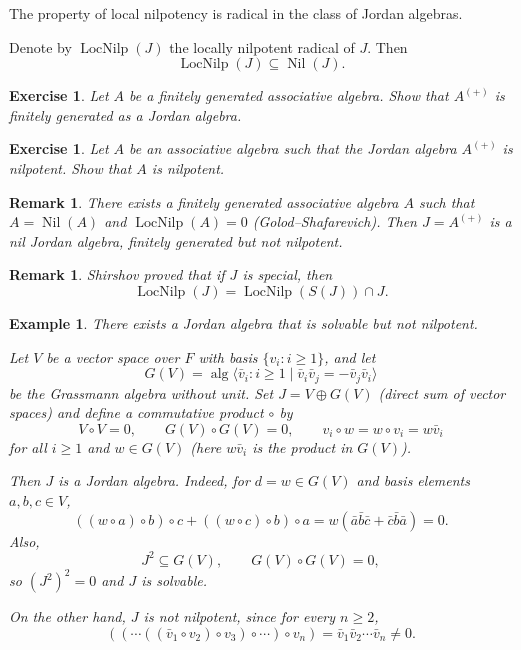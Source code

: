\documentclass{article}
\newtheorem{remark}[theorem]{Remark}
\newtheorem{example}[theorem]{Example}
\newtheorem{exercise}[theorem]{Exercise}
\begin{document}
\begin{theorem}[Zhevlakov]
The property of local nilpotency is radical in the class of Jordan algebras.
\end{theorem}

Denote by $\operatorname{LocNilp}(J)$ the locally nilpotent radical of $J$. Then
\[
\operatorname{LocNilp}(J)\subseteq \operatorname{Nil}(J).
\]

\begin{exercise}
Let $A$ be a finitely generated associative algebra. Show that $A^{(+)}$ is finitely generated as a Jordan algebra.
\end{exercise}

\begin{exercise}
Let $A$ be an associative algebra such that the Jordan algebra $A^{(+)}$ is nilpotent. Show that $A$ is nilpotent.
\end{exercise}

\begin{remark}
There exists a finitely generated associative algebra $A$ such that $A=\operatorname{Nil}(A)$ and $\operatorname{LocNilp}(A)=0$ (Golod--Shafarevich). Then $J=A^{(+)}$ is a nil Jordan algebra, finitely generated but not nilpotent.
\end{remark}

\begin{remark}
Shirshov proved that if $J$ is special, then
\[
\operatorname{LocNilp}(J)=\operatorname{LocNilp}(S(J))\cap J.
\]
\end{remark}

\begin{example}
There exists a Jordan algebra that is solvable but not nilpotent.

Let $V$ be a vector space over $F$ with basis $\{v_i:i\ge1\}$, and let
\[
G(V)=\operatorname{alg}\langle \bar v_i:i\ge1\mid \bar v_i\bar v_j=-\bar v_j\bar v_i\rangle
\]
be the Grassmann algebra without unit. Set $J=V\oplus G(V)$ (direct sum of vector spaces) and define a commutative product $\circ$ by
\[
V\circ V=0,\qquad G(V)\circ G(V)=0,\qquad v_i\circ w=w\circ v_i=w\bar v_i
\]
for all $i\ge1$ and $w\in G(V)$ (here $w\bar v_i$ is the product in $G(V)$).

Then $J$ is a Jordan algebra. Indeed, for $d=w\in G(V)$ and basis elements $a,b,c\in V$,
\[
((w\circ a)\circ b)\circ c+((w\circ c)\circ b)\circ a
= w(\bar a\bar b\bar c+\bar c\bar b\bar a)=0.
\]
Also,
\[
J^2\subseteq G(V),\qquad G(V)\circ G(V)=0,
\]
so $(J^2)^2=0$ and $J$ is solvable.

On the other hand, $J$ is not nilpotent, since for every $n\ge2$,
\[
((\cdots((\bar v_1\circ v_2)\circ v_3)\circ\cdots)\circ v_n)=\bar v_1\bar v_2\cdots\bar v_n\neq0.
\]
\end{example}
\end{document}
